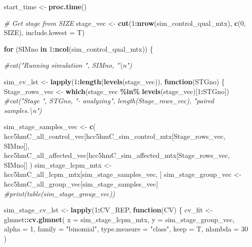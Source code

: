 \documentclass[
]{book}
\newenvironment{Shaded}{\begin{snugshade}}{\end{snugshade}}
\newcommand{\CommentTok}[1]{\textcolor[rgb]{0.56,0.35,0.01}{\textit{#1}}}
\newcommand{\ControlFlowTok}[1]{\textcolor[rgb]{0.13,0.29,0.53}{\textbf{#1}}}
\newcommand{\DataTypeTok}[1]{\textcolor[rgb]{0.13,0.29,0.53}{#1}}
\newcommand{\DecValTok}[1]{\textcolor[rgb]{0.00,0.00,0.81}{#1}}
\newcommand{\KeywordTok}[1]{\textcolor[rgb]{0.13,0.29,0.53}{\textbf{#1}}}
\newcommand{\NormalTok}[1]{#1}
\newcommand{\OperatorTok}[1]{\textcolor[rgb]{0.81,0.36,0.00}{\textbf{#1}}}
\newcommand{\StringTok}[1]{\textcolor[rgb]{0.31,0.60,0.02}{#1}}
\begin{document}
\begin{Shaded}
\begin{Highlighting}[]
\NormalTok{start\_time <{-}}\StringTok{ }\KeywordTok{proc.time}\NormalTok{()}

\CommentTok{\# Get stage from SIZE}
\NormalTok{stage\_vec <{-}}\StringTok{ }\KeywordTok{cut}\NormalTok{(}\DecValTok{1}\OperatorTok{:}\KeywordTok{nrow}\NormalTok{(sim\_control\_qual\_mtx), }\KeywordTok{c}\NormalTok{(}\DecValTok{0}\NormalTok{, SIZE), }\DataTypeTok{include.lowest =}\NormalTok{ T)}

\ControlFlowTok{for}\NormalTok{ (SIMno }\ControlFlowTok{in} \DecValTok{1}\OperatorTok{:}\KeywordTok{ncol}\NormalTok{(sim\_control\_qual\_mtx)) \{}

  \CommentTok{\#cat("Running simulation ", SIMno, "\textbackslash{}n")}

\NormalTok{  sim\_cv\_lst <{-}}\StringTok{ }\KeywordTok{lapply}\NormalTok{(}\DecValTok{1}\OperatorTok{:}\KeywordTok{length}\NormalTok{(}\KeywordTok{levels}\NormalTok{(stage\_vec)), }\ControlFlowTok{function}\NormalTok{(STGno) \{}
\NormalTok{    Stage\_rows\_vec <{-}}\StringTok{ }\KeywordTok{which}\NormalTok{(stage\_vec }\OperatorTok{\%in\%}\StringTok{ }\KeywordTok{levels}\NormalTok{(stage\_vec)[}\DecValTok{1}\OperatorTok{:}\NormalTok{STGno])}
    \CommentTok{\#cat("Stage ", STGno, "{-} analyzing", length(Stage\_rows\_vec), "paired samples.\textbackslash{}n")}

\NormalTok{    sim\_stage\_samples\_vec <{-}}\StringTok{ }\KeywordTok{c}\NormalTok{(}
\NormalTok{      hcc5hmC\_all\_control\_vec[hcc5hmC\_sim\_control\_mtx[Stage\_rows\_vec, SIMno]],}
\NormalTok{      hcc5hmC\_all\_affected\_vec[hcc5hmC\_sim\_affected\_mtx[Stage\_rows\_vec, SIMno]]}
\NormalTok{    )}
\NormalTok{    sim\_stage\_lcpm\_mtx <{-}}\StringTok{ }\NormalTok{hcc5hmC\_all\_lcpm\_mtx[sim\_stage\_samples\_vec, ]}
\NormalTok{    sim\_stage\_group\_vec <{-}}\StringTok{ }\NormalTok{hcc5hmC\_all\_group\_vec[sim\_stage\_samples\_vec]}
    \CommentTok{\#print(table(sim\_stage\_group\_vec))}

\NormalTok{    sim\_stage\_cv\_lst <{-}}\StringTok{ }\KeywordTok{lapply}\NormalTok{(}\DecValTok{1}\OperatorTok{:}\NormalTok{CV\_REP, }\ControlFlowTok{function}\NormalTok{(CV) \{}
\NormalTok{      cv\_fit <{-}}\StringTok{ }\NormalTok{glmnet}\OperatorTok{::}\KeywordTok{cv.glmnet}\NormalTok{(}
        \DataTypeTok{x =}\NormalTok{ sim\_stage\_lcpm\_mtx,}
        \DataTypeTok{y =}\NormalTok{ sim\_stage\_group\_vec,}
        \DataTypeTok{alpha =} \DecValTok{1}\NormalTok{,}
        \DataTypeTok{family =} \StringTok{"binomial"}\NormalTok{,}
        \DataTypeTok{type.measure =} \StringTok{"class"}\NormalTok{,}
        \DataTypeTok{keep =}\NormalTok{ T,}
        \DataTypeTok{nlambda =} \DecValTok{30}
\NormalTok{      )}


\end{Highlighting}
\end{Shaded}
\end{document}
